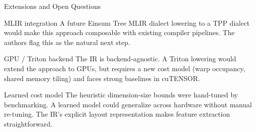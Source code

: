 \documentclass[aspectratio=169,10pt]{beamer}
\begin{document}
\begin{frame}{Extensions and Open Questions}

\begin{block}{MLIR integration}
A future Einsum Tree MLIR dialect lowering to a TPP dialect would make this approach composable with existing compiler pipelines. The authors flag this as the natural next step.
\end{block}

\medskip
\begin{block}{GPU / Triton backend}
The IR is backend-agnostic. A Triton lowering would extend the approach to GPUs, but requires a new cost model (warp occupancy, shared memory tiling) and faces strong baselines in cuTENSOR.
\end{block}

\medskip
\begin{block}{Learned cost model}
The heuristic dimension-size bounds were hand-tuned by benchmarking.
A learned model could generalize across hardware without manual re-tuning.
The IR's explicit layout representation makes feature extraction straightforward.
\end{block}

\end{frame}
\end{document}
